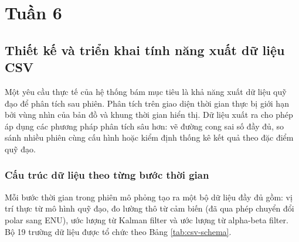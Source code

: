 \section{Tuần 6}

\subsection{Thiết kế và triển khai tính năng xuất dữ liệu CSV}

\hspace{0.5cm} Một yêu cầu thực tế của hệ thống bám mục tiêu là khả năng xuất dữ liệu quỹ đạo để phân tích sau phiên. Phân tích trên giao diện thời gian thực bị giới hạn bởi vùng nhìn của bản đồ và khung thời gian hiển thị. Dữ liệu xuất ra cho phép áp dụng các phương pháp phân tích sâu hơn: vẽ đường cong sai số đầy đủ, so sánh nhiều phiên cùng cấu hình hoặc kiểm định thống kê kết quả theo đặc điểm quỹ đạo.

\subsubsection{Cấu trúc dữ liệu theo từng bước thời gian}

\hspace{0.5cm} Mỗi bước thời gian trong phiên mô phỏng tạo ra một bộ dữ liệu đầy đủ gồm: vị trí thực từ mô hình quỹ đạo, đo lường thô từ cảm biến (đã qua phép chuyển đổi polar sang ENU), ước lượng từ Kalman filter và ước lượng từ alpha-beta filter. Bộ 19 trường dữ liệu được tổ chức theo Bảng \ref{tab:csv-schema}.

